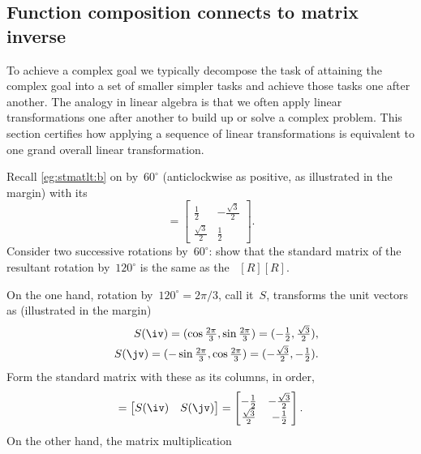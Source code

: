 \subsection{Function composition connects to matrix inverse}

To achieve a complex goal we typically decompose the task of attaining the complex goal into a set of smaller simpler tasks and achieve those tasks one after another.
The analogy in linear algebra is that we often apply linear transformations one after another to build up or solve a complex problem.
This section certifies how applying a sequence of linear transformations is equivalent to one grand overall linear transformation.

\begin{example} 
Recall \cref{eg:stmatlt:b} on  by~\(60^\circ\) (anticlockwise as positive, as illustrated in the margin) with its 
%
\begin{equation*}
[R]=\begin{bmatrix} \frac12&-\frac{\sqrt3}2
\\\frac{\sqrt3}2&\frac12 \end{bmatrix}.
\end{equation*}
Consider two successive rotations by~\(60^\circ\): show that the standard matrix of the resultant rotation by~\(120^\circ\)  is the same as the ~\([R][R]\).
\begin{solution} 
On the one hand, rotation by~\(120^\circ=2\pi/3\), call it~\(S\), transforms the unit vectors as (illustrated in the margin)
%
\begin{eqnarray*}
&&S(\iv)=(\cos\tfrac{2\pi}3,\sin\tfrac{2\pi}3)
=(-\tfrac12,\tfrac{\sqrt3}2),
\\&&S(\jv)=(-\sin\tfrac{2\pi}3,\cos\tfrac{2\pi}3)
=(-\tfrac{\sqrt3}2,-\tfrac12).
\end{eqnarray*}
Form the standard matrix with these as its columns, in order,
\begin{equation*}
[S]=\begin{bmatrix} S(\iv)&S(\jv) \end{bmatrix}
=\begin{bmatrix} -\frac12&-\frac{\sqrt3}2
\\\frac{\sqrt3}2&-\frac12 \end{bmatrix}.
\end{equation*}
On the other hand, the matrix multiplication

\end{solution}
\end{example}
